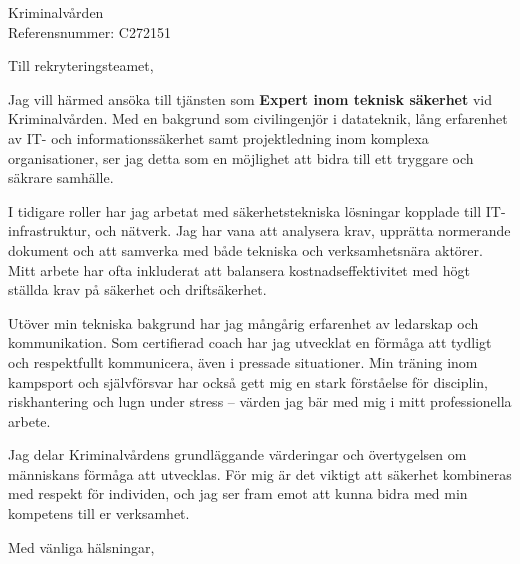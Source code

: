 \documentclass[a4paper,11pt]{letter}
\date{\today}
\begin{document}
\begin{letter}{Kriminalvården \\ Referensnummer: C272151 \\ }
\opening{Till rekryteringsteamet,}

Jag vill härmed ansöka till tjänsten som \textbf{Expert inom teknisk säkerhet} vid Kriminalvården. Med en bakgrund som civilingenjör i datateknik, lång erfarenhet av IT- och informationssäkerhet samt projektledning inom komplexa organisationer, ser jag detta som en möjlighet att bidra till ett tryggare och säkrare samhälle.

I tidigare roller har jag arbetat med säkerhetstekniska lösningar kopplade till IT-infrastruktur, och nätverk. Jag har vana att analysera krav, upprätta normerande dokument och att samverka med både tekniska och verksamhetsnära aktörer. Mitt arbete har ofta inkluderat att balansera kostnadseffektivitet med högt ställda krav på säkerhet och driftsäkerhet.

Utöver min tekniska bakgrund har jag mångårig erfarenhet av ledarskap och kommunikation. Som certifierad coach har jag utvecklat en förmåga att tydligt och respektfullt kommunicera, även i pressade situationer. Min träning inom kampsport och självförsvar har också gett mig en stark förståelse för disciplin, riskhantering och lugn under stress – värden jag bär med mig i mitt professionella arbete.

Jag delar Kriminalvårdens grundläggande värderingar och övertygelsen om människans förmåga att utvecklas. För mig är det viktigt att säkerhet kombineras med respekt för individen, och jag ser fram emot att kunna bidra med min kompetens till er verksamhet.

\closing{Med vänliga hälsningar,}

\end{letter}
\end{document}
